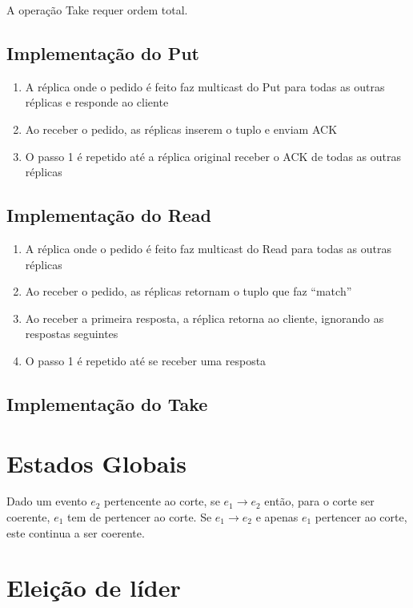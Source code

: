 \documentclass[12pt]{article}
\begin{document}
A operação Take requer ordem total.

\subsection{Implementação do Put}

\begin{enumerate}[itemsep=0pt]
    \item A réplica onde o pedido é feito faz multicast do Put para todas as outras réplicas e responde ao cliente
    \item Ao receber o pedido, as réplicas inserem o tuplo e enviam ACK
    \item O passo 1 é repetido até a réplica original receber o ACK de todas as outras réplicas
\end{enumerate}

\subsection{Implementação do Read}

\begin{enumerate}
    \item A réplica onde o pedido é feito faz multicast do Read para todas as outras réplicas
    \item Ao receber o pedido, as réplicas retornam o tuplo que faz “match”
    \item Ao receber a primeira resposta, a réplica retorna ao cliente, ignorando as respostas seguintes
    \item O passo 1 é repetido até se receber uma resposta
\end{enumerate}

\subsection{Implementação do Take}



\newpage

\section{Estados Globais}

Dado um evento $e_2$ pertencente ao corte, se $e_1 \rightarrow e_2$ então, para o corte ser coerente, $e_1$ tem de pertencer ao corte. Se $e_1 \rightarrow e_2$ e apenas $e_1$ pertencer ao corte, este continua a ser coerente.

\section{Eleição de líder}
\end{document}
